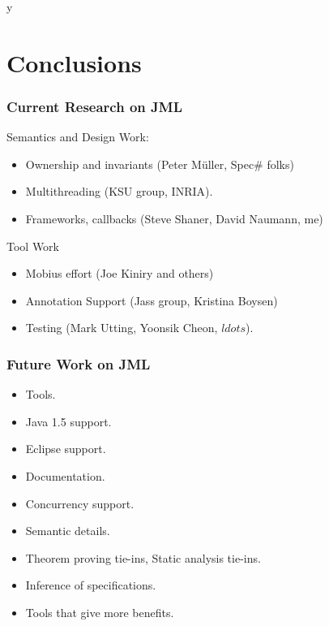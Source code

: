 \if y\MAKEHANDOUTS \documentclass[t,compress,landscape,handout]{beamer}
\begin{document}
\section[Concl.]{Conclusions}



\begin{frame}
\frametitle{Current Research on JML}

Semantics and Design Work:
\begin{itemize}
\item
Ownership and invariants (Peter M\"{u}ller, Spec\# folks)

\item
Multithreading (KSU group, INRIA).

\item
Frameworks, callbacks (Steve Shaner, David Naumann, me)
\end{itemize}

Tool Work
\begin{itemize}
\item
Mobius effort (Joe Kiniry and others)

\item
Annotation Support (Jass group, Kristina Boysen)

\item
Testing (Mark Utting, Yoonsik Cheon, $ldots$).
\end{itemize}
\end{frame}


\begin{frame}
\frametitle{Future Work on JML}
\begin{itemize}
\item
Tools.

\item
Java 1.5 support.

\item
Eclipse support.

\item
Documentation.

\item
Concurrency support.

\item
Semantic details.

\item
Theorem proving tie-ins, Static analysis tie-ins.

\item
Inference of specifications.

\item
Tools that give more benefits.
\end{itemize}
\end{frame}
\end{document}
